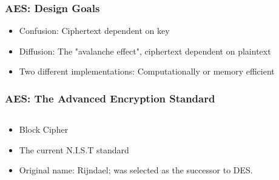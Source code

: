 \documentclass[12pt]{beamer}
\begin{document}
\begin{frame}
\frametitle{AES: Design Goals}
\begin{itemize}
\item Confusion: Ciphertext dependent on key
\item Diffusion: The "avalanche effect", ciphertext dependent on plaintext
\item Two different implementations: Computationally or memory efficient
\end{itemize}
\end{frame}

\begin{frame}
\frametitle{AES: The Advanced Encryption Standard}
\begin{columns}
\begin{column}{0.5\textwidth}
\begin{itemize}
\item Block Cipher
\item The current N.I.S.T standard
\item Original name: Rijndael; was selected as the successor to DES.
\end{itemize}
\end{column}
\begin{column}{0.5\textwidth}
\begin{center}
\end{center}
\end{column}
\end{columns}
\end{frame}
\end{document}
